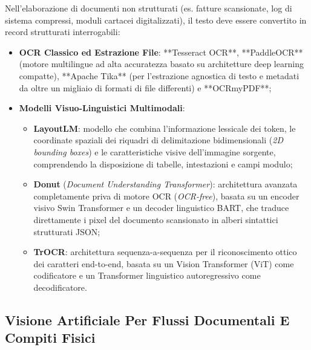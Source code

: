 \documentclass[11pt, a4paper]{article}
\begin{document}
Nell'elaborazione di documenti non strutturati (es. fatture scansionate, log di sistema compressi, moduli cartacei digitalizzati), il testo deve essere convertito in record strutturati interrogabili:
\begin{itemize}
    \item \textbf{OCR Classico ed Estrazione File}: **Tesseract OCR**, **PaddleOCR** (motore multilingue ad alta accuratezza basato su architetture deep learning compatte), **Apache Tika** (per l'estrazione agnostica di testo e metadati da oltre un migliaio di formati di file differenti) e **OCRmyPDF**;
    \item \textbf{Modelli Visuo-Linguistici Multimodali}:
    \begin{itemize}
        \item \textbf{LayoutLM}: modello che combina l'informazione lessicale dei token, le coordinate spaziali dei riquadri di delimitazione bidimensionali (\emph{2D bounding boxes}) e le caratteristiche visive dell'immagine sorgente, comprendendo la disposizione di tabelle, intestazioni e campi modulo;
        \item \textbf{Donut} (\emph{Document Understanding Transformer}): architettura avanzata completamente priva di motore OCR (\emph{OCR-free}), basata su un encoder visivo Swin Transformer e un decoder linguistico BART, che traduce direttamente i pixel del documento scansionato in alberi sintattici strutturati JSON;
        \item \textbf{TrOCR}: architettura sequenza-a-sequenza per il riconoscimento ottico dei caratteri end-to-end, basata su un Vision Transformer (ViT) come codificatore e un Transformer linguistico autoregressivo come decodificatore.
    \end{itemize}
\end{itemize}


\subsection{Visione Artificiale Per Flussi Documentali E Compiti Fisici}
\end{document}
